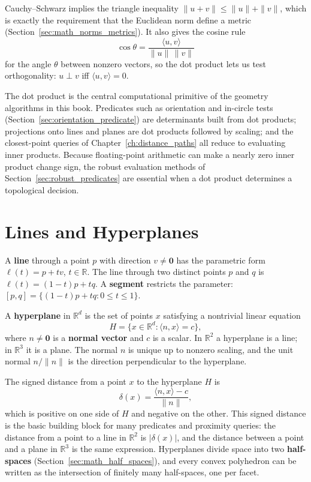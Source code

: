 Cauchy--Schwarz implies the triangle inequality
$\|u+v\| \le \|u\| + \|v\|$, which is exactly the requirement that the
Euclidean norm define a metric (Section~\ref{sec:math_norms_metrics}). It also
gives the cosine rule
\[
  \cos \theta = \frac{\langle u,v\rangle}{\|u\|\,\|v\|}
\]
for the angle $\theta$ between nonzero vectors, so the dot product lets us
test orthogonality: $u \perp v$ iff $\langle u,v\rangle = 0$.

The dot product is the central computational primitive of the geometry
algorithms in this book. Predicates such as orientation and in-circle tests
(Section~\ref{sec:orientation_predicate}) are determinants built from dot
products; projections onto lines and planes are dot products followed by
scaling; and the closest-point queries of Chapter~\ref{ch:distance_paths} all
reduce to evaluating inner products. Because floating-point arithmetic can
make a nearly zero inner product change sign, the robust evaluation methods
of Section~\ref{sec:robust_predicates} are essential when a dot product
determines a topological decision.


\section{Lines and Hyperplanes}
\label{sec:math_lines_hyperplanes}

A \textbf{line} through a point $p$ with direction $v \neq \mathbf{0}$ has
the parametric form $\ell(t) = p + t v$, $t \in \mathbb{R}$. The line through
two distinct points $p$ and $q$ is $\ell(t) = (1-t)p + tq$. A
\textbf{segment} restricts the parameter: $[p,q] = \{(1-t)p + tq : 0 \le t
\le 1\}$.

A \textbf{hyperplane} in $\mathbb{R}^d$ is the set of points $x$ satisfying
a nontrivial linear equation
\[
  H = \{ x \in \mathbb{R}^d : \langle n, x\rangle = c \},
\]
where $n \neq \mathbf{0}$ is a \textbf{normal vector} and $c$ is a scalar.
In $\mathbb{R}^2$ a hyperplane is a line; in $\mathbb{R}^3$ it is a plane.
The normal $n$ is unique up to nonzero scaling, and the unit normal
$n/\|n\|$ is the direction perpendicular to the hyperplane.

The signed distance from a point $x$ to the hyperplane $H$ is
\[
  \delta(x) = \frac{\langle n, x\rangle - c}{\|n\|},
\]
which is positive on one side of $H$ and negative on the other. This signed
distance is the basic building block for many predicates and proximity
queries: the distance from a point to a line in $\mathbb{R}^2$ is
$|\delta(x)|$, and the distance between a point and a plane in
$\mathbb{R}^3$ is the same expression. Hyperplanes divide space into two
\textbf{half-spaces} (Section~\ref{sec:math_half_spaces}), and every convex
polyhedron can be written as the intersection of finitely many half-spaces,
one per facet.

